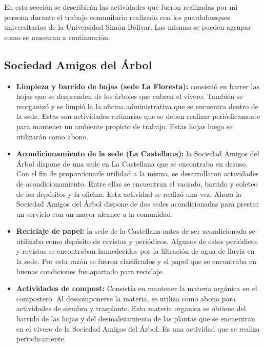 En esta sección se describirán las actividades que fueron realizadas por mi persona durante el trabajo comunitario realizado con los guardabosques universitarios de la Universidad Simón Bolívar. Las mismas se pueden agrupar como se muestran a continuación.

\subsection*{Sociedad Amigos del Árbol}

\begin{itemize}

\item \textbf{Limpieza y barrido de hojas (sede La Floresta):} consistió en barrer las hojas que se desprenden de los árboles que cubren el vivero. También se reorganizó y se limpió la la oficina administrativa que se encuentra dentro de la sede. Estas son actividades rutinarias que se deben realizar periódicamente para mantener un ambiente propicio de trabajo. Estas hojas luego se utilizarán como abono.

\item \textbf{Acondicionamiento de la sede (La Castellana):} la Sociedad Amigos del Árbol dispone de una sede en La Castellana que se encontraba en desuso. Con el fin de proporcionarle utilidad a la misma, se desarrollaron actividades de acondicionamiento. Entre ellas se encuentran el vaciado, barrido y coleteo de los depósitos y la oficina. Esta actividad se realizó una vez. Ahora la Sociedad Amigos del Árbol dispone de dos sedes acondicionadas para prestar un servicio con un mayor alcance a la comunidad.

\item \textbf{Reciclaje de papel:} la sede de la Castellana antes de ser acondicionada se utilizaba como depósito de revistas y periódicos. Algunos de estos periódicos y revistas se encontraban humedecidos por la filtración de agua de lluvia en la sede. Por esta razón se fueron clasificados y el papel que se encontraba en buenas condiciones fue apartado para reciclaje. 

\item \textbf{Actividades de compost:} Consistía en mantener la materia orgánica en el compostero. Al descomponerse la materia, se utiliza como abono para actividades de siembra y trasplante. Esta materia organica se obtiene del barrido de las hojas y del desmalezamiento de las plantas que se encuentran en el vivero de la Sociedad Amigos del Árbol. Es una actividad que se realiza periodicamente.


\end{itemize}
